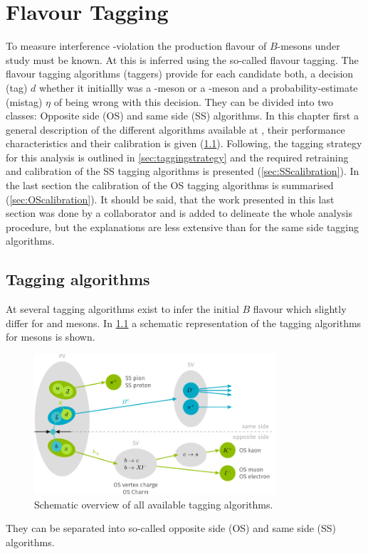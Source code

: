 \chapter{Flavour Tagging}
\label{ch:flavourtagging}

To measure interference \CP-violation the production flavour of $B$-mesons under study must be known.
At \lhcb this is inferred using the so-called flavour tagging.
The flavour tagging algorithms (taggers) provide for each candidate both, a decision (tag) $d$ whether it initiallly was a \Bz-meson or a \Bzb-meson and a probability-estimate (mistag) $\eta$ of being wrong with this decision.
They can be divided into two classes: Opposite side (OS) and same side (SS) algorithms.
In this chapter first a general description of the different algorithms available at \lhcb, their performance characteristics and their calibration is given (\cref{sec:taggingalgorithms}).
Following, the tagging strategy for this analysis is outlined in \cref{sec:taggingstrategy} and the required retraining and calibration of the SS tagging algorithms is presented (\cref{sec:SScalibration}).
In the last section the calibration of the OS tagging algorithms is summarised (\cref{sec:OScalibration}).
It should be said, that the work presented in this last section was done by a collaborator and is added to delineate the whole analysis procedure, but the explanations are less extensive than for the same side tagging algorithms.


\section{Tagging algorithms}
\label{sec:taggingalgorithms}

At \lhcb several tagging algorithms exist to infer the initial $B$ flavour which slightly differ for \Bz and \Bs mesons.
In \cref{fig:taggingalgorithms} a schematic representation of the tagging algorithms for \Bz mesons is shown.
\begin{figure}[tbp]
    \centering
    \includegraphics[width=0.8\textwidth]{08FlavourTagging/figs/FTscheme.pdf}
    \caption{Schematic overview of all available \Bz tagging algorithms.}
    \label{fig:taggingalgorithms}
\end{figure}
They can be separated into so-called opposite side (OS) and same side (SS) algorithms.

